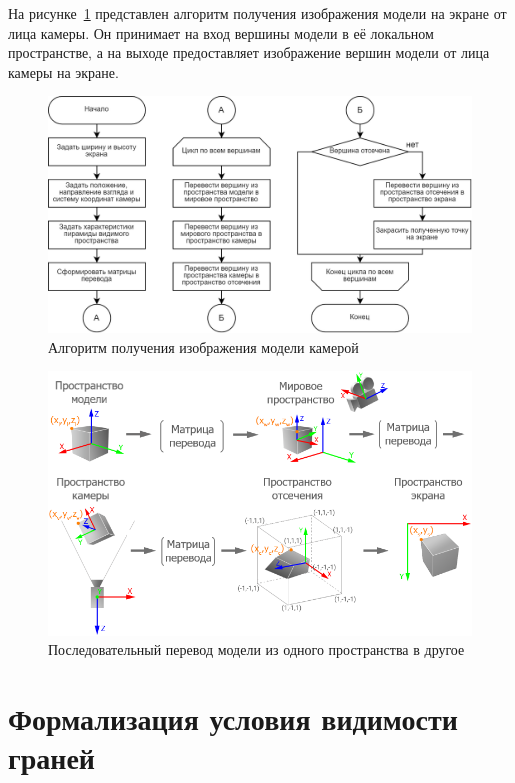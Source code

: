 На рисунке~\ref{fig:camera-image} представлен алгоритм получения изображения модели на экране от лица камеры. Он принимает на вход вершины модели в её локальном пространстве, а на выходе предоставляет изображение вершин модели от лица камеры на экране.
\begin{figure}[h] 
	\centering
	\includegraphics[width=1\textwidth]{images/camera-image.png}
	\caption{Алгоритм получения изображения модели камерой} 
	\label{fig:camera-image} 
\end{figure}
\begin{figure}[h] 
	\centering
	\includegraphics[width=1\textwidth]{images/space_transformations.png}
	\caption{Последовательный перевод модели из одного пространства в другое} 
	\label{fig:space-transformations} 
\end{figure}

\clearpage

\section{Формализация условия видимости граней}

